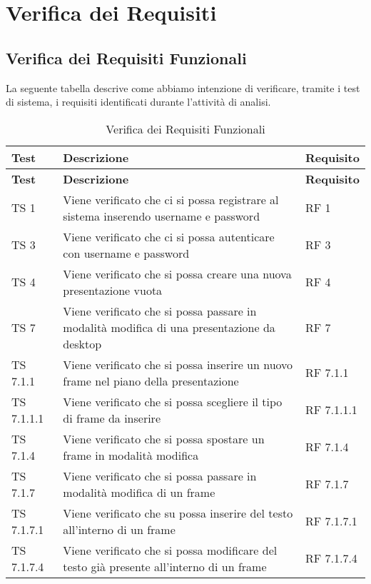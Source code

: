 \section{Verifica dei Requisiti}{
\subsection{Verifica dei Requisiti Funzionali}{
	La seguente tabella descrive come abbiamo intenzione di verificare, tramite i test di sistema, i requisiti identificati durante l'attività di analisi.
	
		\renewcommand*{\arraystretch}{1.4}
		\begin{longtable} [c]{| p{3cm} | p{6cm} |p{3cm}|}
			\caption{Verifica dei Requisiti Funzionali \label{tab:verReqFunz}}\\
			 \hline
			 \textbf{Test} & \textbf{Descrizione} & \textbf{Requisito} \\
			 \hline
			 \endfirsthead
			 \hline
			 \textbf{Test} & \textbf{Descrizione} & \textbf{Requisito} \\
			 \hline
			\endhead
			 \hline
			 \endfoot
			 \hline
			 \endlastfoot
			TS 1 & Viene verificato che ci si possa registrare al sistema inserendo username e password & RF 1\\
			\hline
			TS 3 & Viene verificato che ci si possa autenticare con username e password & RF 3\\
			\hline
			TS 4 & Viene verificato che si possa creare una nuova presentazione vuota & RF 4\\
			\hline
			TS 7 & Viene verificato che si possa passare in modalità modifica di una presentazione da desktop & RF 7\\
			\hline
			TS 7.1.1 & Viene verificato che si possa inserire un nuovo frame nel piano della presentazione & RF 7.1.1\\
			\hline
			TS 7.1.1.1 & Viene verificato che si possa scegliere il tipo di frame da inserire & RF 7.1.1.1\\
			\hline
			TS 7.1.4 & Viene verificato che si possa spostare un frame in modalità modifica & RF 7.1.4\\
			\hline
			TS 7.1.7 & Viene verificato che si possa passare in modalità modifica di un frame & RF 7.1.7\\
			\hline
			TS 7.1.7.1 & Viene verificato che su possa inserire del testo all'interno di un frame & RF 7.1.7.1\\
			\hline
			TS 7.1.7.4 & Viene verificato che si possa modificare del testo già presente all'interno di un frame & RF 7.1.7.4\\

\end{longtable}}}
